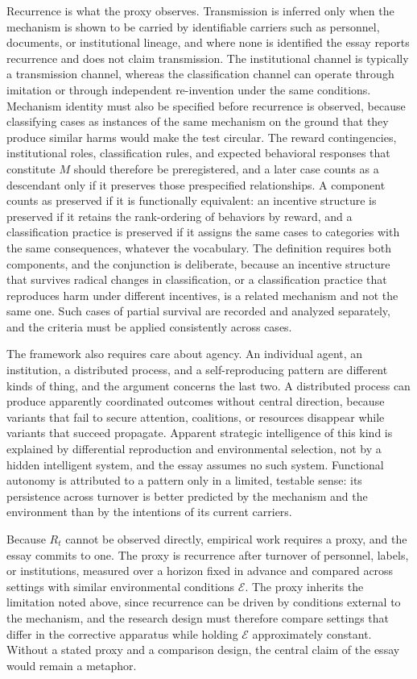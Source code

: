 \documentclass[12pt]{article}
\theoremstyle{remark}
\begin{document}
Recurrence is what the proxy observes. Transmission is inferred only when the mechanism is shown to be carried by identifiable carriers such as personnel, documents, or institutional lineage, and where none is identified the essay reports recurrence and does not claim transmission. The institutional channel is typically a transmission channel, whereas the classification channel can operate through imitation or through independent re-invention under the same conditions. Mechanism identity must also be specified before recurrence is observed, because classifying cases as instances of the same mechanism on the ground that they produce similar harms would make the test circular. The reward contingencies, institutional roles, classification rules, and expected behavioral responses that constitute $M$ should therefore be preregistered, and a later case counts as a descendant only if it preserves those prespecified relationships. A component counts as preserved if it is functionally equivalent: an incentive structure is preserved if it retains the rank-ordering of behaviors by reward, and a classification practice is preserved if it assigns the same cases to categories with the same consequences, whatever the vocabulary. The definition requires both components, and the conjunction is deliberate, because an incentive structure that survives radical changes in classification, or a classification practice that reproduces harm under different incentives, is a related mechanism and not the same one. Such cases of partial survival are recorded and analyzed separately, and the criteria must be applied consistently across cases.

The framework also requires care about agency. An individual agent, an institution, a distributed process, and a self-reproducing pattern are different kinds of thing, and the argument concerns the last two. A distributed process can produce apparently coordinated outcomes without central direction, because variants that fail to secure attention, coalitions, or resources disappear while variants that succeed propagate. Apparent strategic intelligence of this kind is explained by differential reproduction and environmental selection, not by a hidden intelligent system, and the essay assumes no such system. Functional autonomy is attributed to a pattern only in a limited, testable sense: its persistence across turnover is better predicted by the mechanism and the environment than by the intentions of its current carriers.

Because $R_t$ cannot be observed directly, empirical work requires a proxy, and the essay commits to one. The proxy is recurrence after turnover of personnel, labels, or institutions, measured over a horizon fixed in advance and compared across settings with similar environmental conditions $\mathcal{E}$. The proxy inherits the limitation noted above, since recurrence can be driven by conditions external to the mechanism, and the research design must therefore compare settings that differ in the corrective apparatus while holding $\mathcal{E}$ approximately constant. Without a stated proxy and a comparison design, the central claim of the essay would remain a metaphor.
\end{document}
